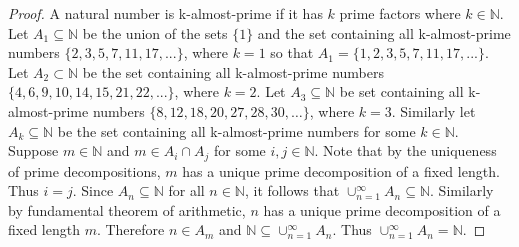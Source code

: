 \documentclass[12pt]{article}
\newcommand{\NN}{\ensuremath{\mathbb N}}
\begin{document}
\begin{proof}
	A natural number is k-almost-prime if it has $k$ prime factors where $k \in \NN$.
	Let $A_1 \subseteq \NN$ be the union of the sets $\{1\}$ and the set containing all k-almost-prime numbers $\{2,3,5,7,11,17, ...\}$, where $k = 1$ so that $A_1 = \{1,2,3,5,7,11,17,...\}$. Let $A_2 \subset \NN$ be the set containing all k-almost-prime numbers $\{4,6,9,10,14,15,21,22,...\}$, where $k = 2$. Let $A_3 \subseteq \NN$ be set containing all k-almost-prime numbers $\{8, 12, 18, 20, 27, 28, 30, … \}$, where $k = 3$. Similarly let $A_k \subseteq \NN$ be the set containing all k-almost-prime numbers for some $k \in \NN$. Suppose $m \in \NN$ and $m \in A_i \cap A_j$ for some $i, j \in \NN$. Note that by the uniqueness of prime decompositions, $m$ has a unique prime decomposition of a fixed length. Thus $i = j$. Since $A_n \subseteq \NN$ for all $n \in \NN$, it follows that $\cup_{n=1}^{\infty}A_n \subseteq \NN$. Similarly by fundamental theorem of arithmetic, $n$ has a unique prime decomposition of a fixed length $m$. Therefore $n \in A_m$ and $\NN \subseteq \cup_{n=1}^{\infty} A_n$. Thus $\cup_{n=1}^{\infty} A_n = \NN$.
\end{proof}
\end{document}
